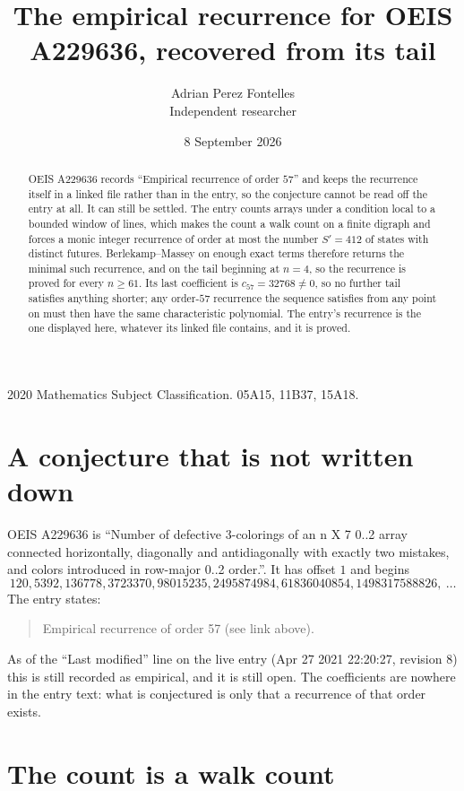 \documentclass[11pt,a4paper]{article}
\title{The empirical recurrence for OEIS A229636, recovered from its tail}
\author{Adrian Perez Fontelles\\ \small Independent researcher}
\date{8 September 2026}
\theoremstyle{plain}
\theoremstyle{definition}
\begin{document}
\maketitle

\begin{abstract}
OEIS A229636 records ``Empirical recurrence of order $57$'' and keeps the recurrence itself in
a linked file rather than in the entry, so the conjecture cannot be read off the entry at all.
It can still be settled. The entry counts arrays under a condition local to a bounded window of
lines, which makes the count a walk count on a finite digraph and forces a monic integer
recurrence of order at most the number $S'=412$ of states with distinct futures. Berlekamp--Massey on
enough exact terms therefore returns the minimal such recurrence, and on the tail beginning at $n=4$, so the recurrence is proved for every $n\ge61$.
Its last coefficient is $c_{57}=32768\neq0$, so no further tail satisfies anything
shorter; any order-$57$ recurrence the sequence satisfies from any point on must then have
the same characteristic polynomial. The entry's recurrence is the one displayed here, whatever
its linked file contains, and it is proved.
\end{abstract}

\noindent\small 2020 Mathematics Subject Classification. 05A15, 11B37, 15A18.\normalsize

\section{A conjecture that is not written down}

OEIS A229636 is ``Number of defective 3-colorings of an n X 7 0..2 array connected horizontally, diagonally and antidiagonally with exactly two mistakes, and colors introduced in row-major 0..2 order.''. It has offset $1$ and begins
\[
120, 5392, 136778, 3723370, 98015235, 2495874984, 61836040854, 1498317588826,\ \dots
\]
The entry states:
\begin{quote}
Empirical recurrence of order 57 (see link above).
\end{quote}
As of the ``Last modified'' line on the live entry (Apr 27 2021 22:20:27, revision 8)
this is still recorded as empirical, and it is still open. The coefficients are nowhere in the
entry text: what is conjectured is only that a recurrence of that order exists.

\section{The count is a walk count}
\end{document}
